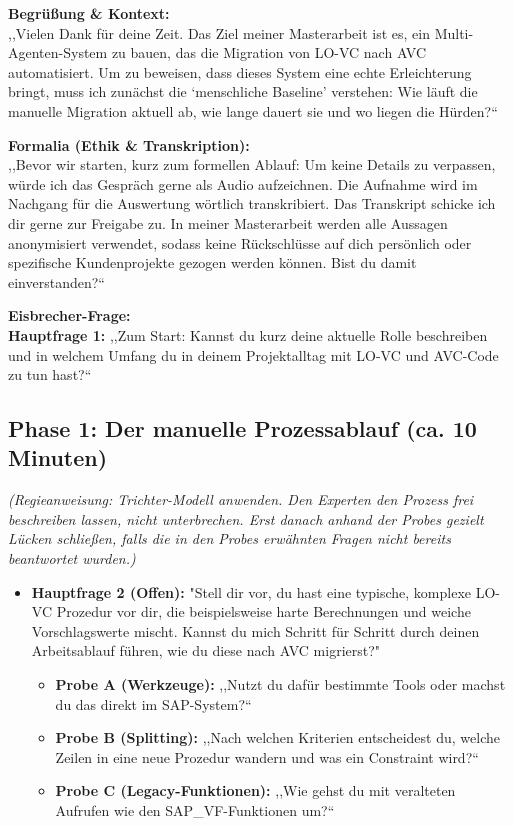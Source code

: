 \documentclass[12pt, a4paper, oneside]{book}
\begin{document}
\vspace{0.5em}
\noindent\textbf{Begrüßung \& Kontext:}\\
,,Vielen Dank für deine Zeit. Das Ziel meiner Masterarbeit ist es, ein Multi-Agenten-System zu bauen, das die Migration von LO-VC nach AVC automatisiert. Um zu beweisen, dass dieses System eine echte Erleichterung bringt, muss ich zunächst die `menschliche Baseline' verstehen: Wie läuft die manuelle Migration aktuell ab, wie lange dauert sie und wo liegen die Hürden?``

\vspace{0.5em}
\noindent\textbf{Formalia (Ethik \& Transkription):}\\
,,Bevor wir starten, kurz zum formellen Ablauf: Um keine Details zu verpassen, würde ich das Gespräch gerne als Audio aufzeichnen. Die Aufnahme wird im Nachgang für die Auswertung wörtlich transkribiert. Das Transkript schicke ich dir gerne zur Freigabe zu. In meiner Masterarbeit werden alle Aussagen anonymisiert verwendet, sodass keine Rückschlüsse auf dich persönlich oder spezifische Kundenprojekte gezogen werden können. Bist du damit einverstanden?``

\vspace{0.5em}
\noindent\textbf{Eisbrecher-Frage:}\\
\textbf{Hauptfrage 1:} ,,Zum Start: Kannst du kurz deine aktuelle Rolle beschreiben und in welchem Umfang du in deinem Projektalltag mit LO-VC und AVC-Code zu tun hast?``

\subsection*{Phase 1: Der manuelle Prozessablauf (ca. 10 Minuten)}
\textit{(Regieanweisung: Trichter-Modell anwenden. Den Experten den Prozess frei beschreiben lassen, nicht unterbrechen. Erst danach anhand der Probes gezielt Lücken schließen, falls die in den Probes erwähnten Fragen nicht bereits beantwortet wurden.)}

\begin{itemize}
    \item \textbf{Hauptfrage 2 (Offen):} "Stell dir vor, du hast eine typische, komplexe LO-VC Prozedur vor dir, die beispielsweise harte Berechnungen und weiche Vorschlagswerte mischt. Kannst du mich Schritt für Schritt durch deinen Arbeitsablauf führen, wie du diese nach AVC migrierst?"
    \begin{itemize}
        \item \textbf{Probe A (Werkzeuge):} ,,Nutzt du dafür bestimmte Tools oder machst du das direkt im SAP-System?``
        \item \textbf{Probe B (Splitting):} ,,Nach welchen Kriterien entscheidest du, welche Zeilen in eine neue Prozedur wandern und was ein Constraint wird?``
        \item \textbf{Probe C (Legacy-Funktionen):} ,,Wie gehst du mit veralteten Aufrufen wie den SAP\_VF-Funktionen um?``
    \end{itemize}
\end{itemize}
\end{document}

